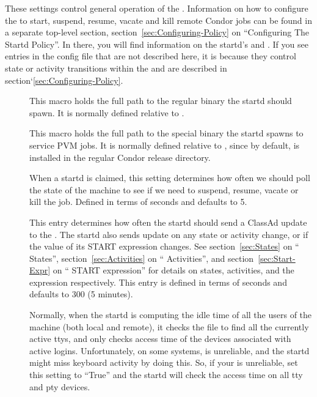 These settings control general operation of the .
Information on how to configure the  to start, suspend,
resume, vacate and kill remote Condor jobs can be found in a separate
top-level section, section~\ref{sec:Configuring-Policy} on
``Configuring The Startd Policy''.  In there, you will find
information on the startd's  and .  If
you see entries in the config file that are not described here, it is
because they control state or activity transitions within the
 and are described in
section`\ref{sec:Configuring-Policy}. 

\begin{description}

\item[] \label{param:Starter}  This macro holds the full
  path to the regular  binary the startd should
  spawn.  It is normally defined relative to .
  
\item[] \label{param:AlternateStarter1}
  This macro holds the full path to the special 
  binary the startd spawns to service PVM jobs.  It is normally
  defined relative to , since by default,
   is installed in the regular Condor release
  directory. 
  
\item[] \label{param:PollingInterval} When a
  startd is claimed, this setting determines how often we should poll
  the state of the machine to see if we need to suspend, resume,
  vacate or kill the job.  Defined in terms of seconds and defaults to
  5.
  
\item[] \label{param:UpdateInterval} This
  entry determines how often the startd should send a ClassAd update
  to the .  The startd also sends update on any
  state or activity change, or if the value of its START expression
  changes.  See section~\ref{sec:States} on ``
  States'', section~\ref{sec:Activities} on ``
  Activities'', and section~\ref{sec:Start-Expr} on ``
  START expression'' for details on states, activities, and the
   expression respectively.  This entry is defined in
  terms of seconds and defaults to 300 (5 minutes).
  
\item[] \label{param:StartdHasBadUtmp}
  Normally, when the startd is computing the idle time of all the
  users of the machine (both local and remote), it checks the
   file to find all the currently active ttys, and only
  checks access time of the devices associated with active logins.
  Unfortunately, on some systems,  is unreliable, and the
  startd might miss keyboard activity by doing this.  So, if your
   is unreliable, set this setting to ``True'' and the
  startd will check the access time on all tty and pty devices.
  

\end{description}
